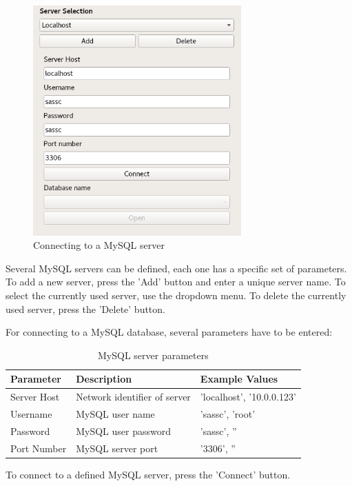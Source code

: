 \documentclass[10pt,letterpaper,extrafontsizes]{memoir}
\begin{document}
\begin{figure}[H]
  \center
    \includegraphics[width=8cm,frame]{../screenshots/mysql_server_selection.png}
  \caption{Connecting to a MySQL server}
  \label{fig:mysql_connect}
\end{figure}

Several MySQL servers can be defined, each one has a specific set of parameters. To add a new server, press the 'Add' button and enter a unique server name. To select the currently used server, use the dropdown menu. To delete the currently used server, press the 'Delete' button.

For connecting to a MySQL database, several parameters have to be entered:

\begin{table}[H]
  \center
  \begin{tabular}{ | l | l | l |}
    \hline
    \textbf{Parameter} & \textbf{Description} & \textbf{Example Values} \\ \hline
    Server Host & Network identifier of server & 'localhost', '10.0.0.123' \\ \hline
    Username & MySQL user name & 'sassc', 'root' \\ \hline
    Password & MySQL user password & 'sassc', '' \\ \hline
    Port Number & MySQL server port & '3306', '' \\
    \hline
  \end{tabular}
  \caption{MySQL server parameters}
\end{table}

To connect to a defined MySQL server, press the 'Connect' button.\\
\end{document}
